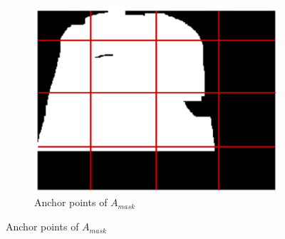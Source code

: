 \documentclass{article}
\begin{document}
\begin{figure}[h!]
\begin{subfigure}[b]{0.25\linewidth}
    \includegraphics[width=\linewidth]{data/images/04_Learned_Collage/Anchor.png}
    \caption{Anchor points of $A_{mask}$}
    \label{fig:anchorpoints}
  \end{subfigure}
  

\end{figure}
\end{document}
